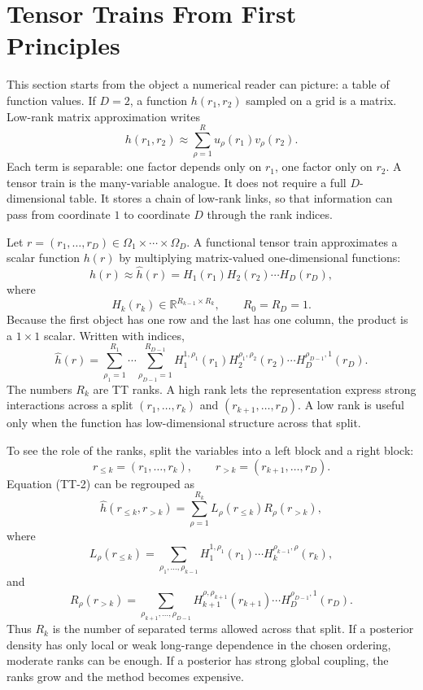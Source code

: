 \documentclass[11pt]{article}
\newcommand{\R}{\mathbb R}
\begin{document}
\section{Tensor Trains From First Principles}

This section starts from the object a numerical reader can picture: a table of
function values.  If \(D=2\), a function \(h(r_1,r_2)\) sampled on a grid is a
matrix.  Low-rank matrix approximation writes
\[
    h(r_1,r_2)\approx \sum_{\rho=1}^{R} u_\rho(r_1)v_\rho(r_2).
\]
Each term is separable: one factor depends only on \(r_1\), one factor only on
\(r_2\).  A tensor train is the many-variable analogue.  It does not require a
full \(D\)-dimensional table.  It stores a chain of low-rank links, so that
information can pass from coordinate \(1\) to coordinate \(D\) through the rank
indices.

Let \(r=(r_1,\ldots,r_D)\in\Omega_1\times\cdots\times\Omega_D\).  A functional
tensor train approximates a scalar function \(h(r)\) by multiplying
matrix-valued one-dimensional functions:
\[
    h(r)
    \approx
    \widehat h(r)
    =
    H_1(r_1)H_2(r_2)\cdots H_D(r_D),
    \tag{TT-1}
\]
where
\[
    H_k(r_k)\in \R^{R_{k-1}\times R_k},\qquad R_0=R_D=1.
\]
Because the first object has one row and the last has one column, the product is
a \(1\times 1\) scalar.  Written with indices,
\[
    \widehat h(r)
    =
    \sum_{\rho_1=1}^{R_1}\cdots
    \sum_{\rho_{D-1}=1}^{R_{D-1}}
    H_1^{1,\rho_1}(r_1)
    H_2^{\rho_1,\rho_2}(r_2)\cdots
    H_D^{\rho_{D-1},1}(r_D).
    \tag{TT-2}
\]
The numbers \(R_k\) are TT ranks.  A high rank lets the representation express
strong interactions across a split \((r_1,\ldots,r_k)\) and
\((r_{k+1},\ldots,r_D)\).  A low rank is useful only when the function has
low-dimensional structure across that split.

To see the role of the ranks, split the variables into a left block and a right
block:
\[
    r_{\le k}=(r_1,\ldots,r_k),\qquad
    r_{>k}=(r_{k+1},\ldots,r_D).
\]
Equation (TT-2) can be regrouped as
\[
    \widehat h(r_{\le k},r_{>k})
    =
    \sum_{\rho=1}^{R_k}
    L_\rho(r_{\le k})R_\rho(r_{>k}),
    \tag{TT-2a}
\]
where
\[
    L_\rho(r_{\le k})
    =
    \sum_{\rho_1,\ldots,\rho_{k-1}}
    H_1^{1,\rho_1}(r_1)\cdots H_k^{\rho_{k-1},\rho}(r_k),
\]
and
\[
    R_\rho(r_{>k})
    =
    \sum_{\rho_{k+1},\ldots,\rho_{D-1}}
    H_{k+1}^{\rho,\rho_{k+1}}(r_{k+1})\cdots
    H_D^{\rho_{D-1},1}(r_D).
\]
Thus \(R_k\) is the number of separated terms allowed across that split.  If a
posterior density has only local or weak long-range dependence in the chosen
ordering, moderate ranks can be enough.  If a posterior has strong global
coupling, the ranks grow and the method becomes expensive.
\end{document}
